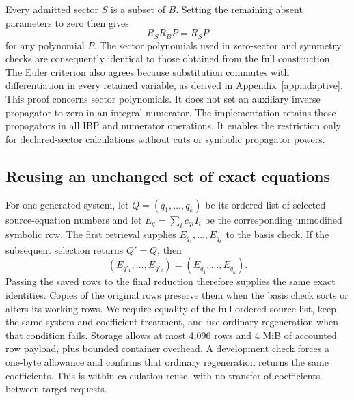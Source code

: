 Every admitted sector $S$ is a subset of $B$. Setting the remaining absent parameters to zero then gives
\begin{equation}
R_SR_BP=R_SP
\end{equation}
for any polynomial $P$. The sector polynomials used in zero-sector and symmetry checks are consequently identical to those obtained from the full construction. The Euler criterion also agrees because substitution commutes with differentiation in every retained variable, as derived in Appendix~\ref{app:adaptive}. This proof concerns sector polynomials. It does not set an auxiliary inverse propagator to zero in an integral numerator. The implementation retains those propagators in all IBP and numerator operations. It enables the restriction only for declared-sector calculations without cuts or symbolic propagator powers.

\subsection{Reusing an unchanged set of exact equations}
For one generated system, let $Q=(q_1,\ldots,q_k)$ be its ordered list of selected source-equation numbers and let $E_q=\sum_i c_{qi}I_i$ be the corresponding unmodified symbolic row. The first retrieval supplies $E_{q_1},\ldots,E_{q_k}$ to the basis check. If the subsequent selection returns $Q'=Q$, then
\begin{equation}
(E_{q'_1},\ldots,E_{q'_k})=(E_{q_1},\ldots,E_{q_k}).
\end{equation}
Passing the saved rows to the final reduction therefore supplies the same exact identities. Copies of the original rows preserve them when the basis check sorts or alters its working rows. We require equality of the full ordered source list, keep the same system and coefficient treatment, and use ordinary regeneration when that condition fails. Storage allows at most 4,096 rows and 4 MiB of accounted row payload, plus bounded container overhead. A development check forces a one-byte allowance and confirms that ordinary regeneration returns the same coefficients. This is within-calculation reuse, with no transfer of coefficients between target requests.

